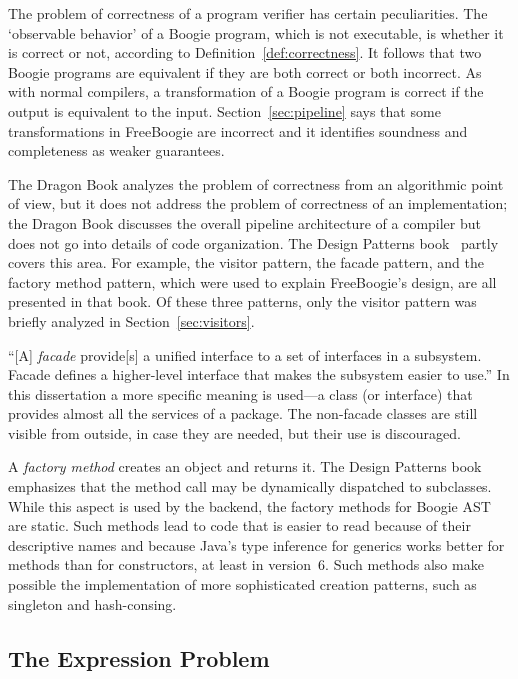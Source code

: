 \documentclass{llncs}
\begin{document}
The problem of correctness of a program verifier has certain
peculiarities. The `observable behavior' of a Boogie program,
which is not executable, is whether it is correct or not,
according to Definition~\ref{def:correctness}. It follows that
two Boogie programs are equivalent if they are both correct or
both incorrect. As with normal compilers, a transformation of
a Boogie program is correct if the output is equivalent to the
input. Section~\ref{sec:pipeline} says that some transformations
in FreeBoogie are incorrect and it identifies soundness and
completeness as weaker guarantees.

The Dragon Book analyzes the problem of correctness from an
algorithmic point of view, but it does not address the problem
of correctness of an implementation; the Dragon Book discusses
the overall pipeline architecture of a compiler but does not
go into details of code organization. The Design Patterns
book~\cite{gamma1995} partly covers this area. For example, the
visitor pattern, the facade pattern, and the factory method
pattern, which were used to explain FreeBoogie's design, are all
presented in that book. Of these three patterns, only the visitor
pattern was briefly analyzed in Section~\ref{sec:visitors}.

``[A] \emph{facade} provide[s] a unified interface to a set
of interfaces in a subsystem. Facade defines a higher-level
interface that makes the subsystem easier to use.'' In this
dissertation a more specific meaning is used---a class (or
interface) that provides almost all the services of a package.
The non-facade classes are still visible from outside, in case
they are needed, but their use is discouraged.

A \emph{factory method} creates an object and returns it. The
Design Patterns book emphasizes that the method call may be
dynamically dispatched to subclasses. While this aspect is used
by the backend, the factory methods for Boogie AST are static.
Such methods lead to code that is easier to read because of their
descriptive names and because Java's type inference for generics
works better for methods than for constructors, at least in
version~6. Such methods also make possible the implementation
of more sophisticated creation patterns, such as singleton and
hash-consing.

\subsection{The Expression Problem} %
\end{document}
